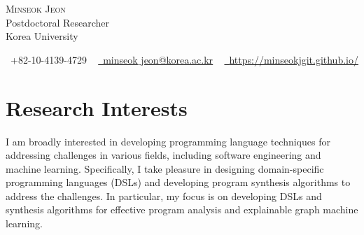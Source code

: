 \documentclass[letterpaper,11pt]{article}
\begin{document}

\begin{center}
    {\Huge \scshape Minseok Jeon} \\ \vspace{1pt}
    Postdoctoral Researcher\\\vspace{1pt}
    Korea University\\\vspace{1pt}
        
    \small \raisebox{-0.1\height}\faPhone\ +82-10-4139-4729 ~ \href{mailto:minseok_jeon@korea.ac.kr}{\raisebox{-0.2\height}\faEnvelope\  \underline{minseok$\_$jeon@korea.ac.kr}} ~ 
    \href{https://minseokjgit.github.io/}{\raisebox{-0.2\height}\faHome\ \underline{https://minseokjgit.github.io/}} 
    \vspace{-8pt}
\end{center}

\section{Research Interests}
I am broadly interested in developing programming language techniques for addressing challenges in various fields, including software engineering and machine learning.
%
Specifically, I take pleasure in designing domain-specific programming languages (DSLs) and developing program synthesis algorithms to address the challenges.
%
In particular, my focus is on developing DSLs and synthesis algorithms for effective program analysis and explainable graph machine learning.


\end{document}
